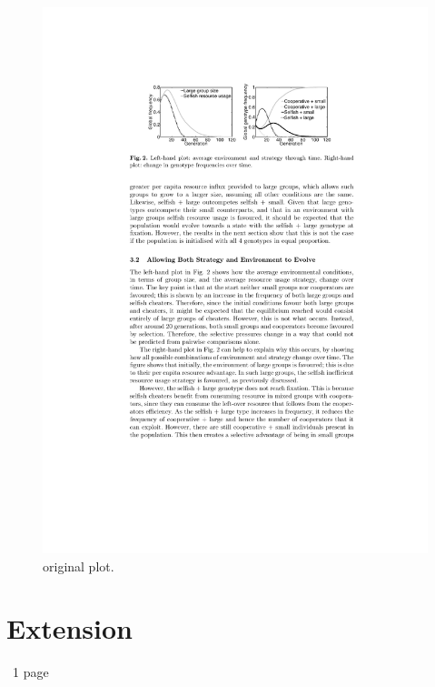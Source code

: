 \documentclass[11pt]{article}
\begin{document}
\begin{figure}[!ht]
  \centering
  \includegraphics[scale=1.25]{original.pdf}
  \caption{original plot.}
  \label{Figure:original}
\end{figure}

\section{Extension}
~1 page
\end{document}
